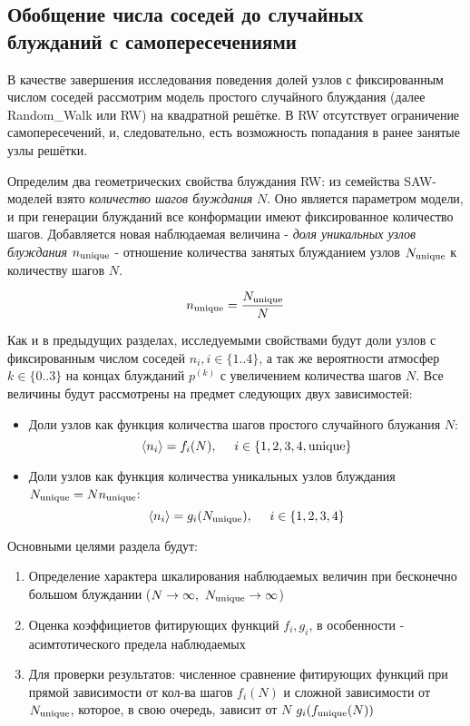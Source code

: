 \subsection{Обобщение числа соседей до случайных блужданий с самопересечениями}

В качестве завершения исследования поведения долей узлов с фиксированным числом соседей рассмотрим модель простого случайного блуждания (далее Random\_Walk или RW) на квадратной решётке. 
В RW отсутствует ограничение самопересечений, и, следовательно, есть возможность попадания в ранее занятые узлы решётки.

Определим два геометрических свойства блуждания RW: из семейства SAW-моделей взято \textit{количество шагов блуждания} $N$. 
Оно является параметром модели, и при генерации блужданий все конформации имеют фиксированное количество шагов.
Добавляется новая наблюдаемая величина - \textit{доля уникальных узлов блуждания} $n_{\textup{unique}}$ - отношение количества занятых блужданием узлов $N_{\textup{unique}}$ к количеству шагов $N$.

\begin{equation}
n_{\textup{unique}} = \frac{N_{\textup{unique}}}{N}
\end{equation}

Как и в предыдущих разделах, исследуемыми свойствами будут доли узлов с фиксированным числом соседей $n_i, i \in \{1..4\}$, а так же вероятности атмосфер $k \in \{0..3\}$ на концах блужданий $p^{(k)}$ с увеличением количества шагов $N$.
Все величины будут рассмотрены на предмет следующих двух зависимостей:

\begin{itemize}
\item Доли узлов как функция количества шагов простого случайного блужания $N$: 
\[ \langle n_i \rangle = f_i(N),\ \ \ \ i \in \{1,2,3,4, \textup{unique}\} \]
\item Доли узлов как функция количества уникальных узлов блуждания $N_{\textup{unique}} = N n_{\textup{unique}}$:
\[ \langle n_i \rangle = g_i(N_{\textup{unique}}),\ \ \ \ i \in \{1,2,3,4\} \]
\end{itemize}

Основными целями раздела будут:

\begin{enumerate}
\item Определение характера шкалирования наблюдаемых величин при бесконечно большом блуждании ($N \to \infty,\ \Nun \to \infty$)
\item Оценка коэффициетов фитирующих функций $f_i, g_i$, в особенности - асимтотического предела наблюдаемых
\item Для проверки результатов: численное сравнение фитирующих функций при прямой зависимости от кол-ва шагов $f_i(N)$ и сложной зависимости от $N_{\textup{unique}}$, которое, в свою очередь, зависит от $N$ $g_i(f_{\textup{unique}}(N))$
\end{enumerate}



